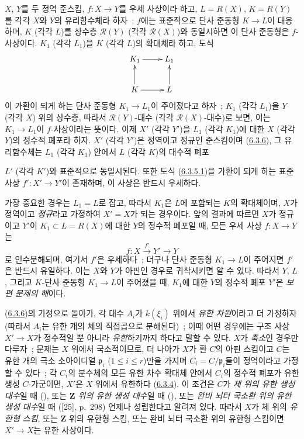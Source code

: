 \begin{env}[6.3.9]
\label{II.6.3.9-ko}
$X$, $Y$를 두 정역 준스킴, $f:X\to Y$를 우세 사상이라 하고,
$L=R(X)$, $K=R(Y)$를 각각 $X$와 $Y$의 유리함수체라 하자~; $f$에는
표준적으로 단사 준동형 $K\to L$이 대응하며, $K$ (각각 $L$)를 상수층
$\mathcal{R}(Y)$ (각각 $\mathcal{R}(X)$)와 동일시하면 이 단사 준동형은
$f$-사상이다. $K_1$ (각각 $L_1$)을 $K$ (각각 $L$)의 확대체라 하고,
도식
\[
\xymatrix{
K_1\ar[r]&L_1\\
K\ar[u]\ar[r]&L\ar[u]
}
\]
이 가환이 되게 하는 단사 준동형 $K_1\to L_1$이 주어졌다고 하자~;
$K_1$ (각각 $L_1$)을 $Y$ (각각 $X$) 위의 상수층, 따라서
$\mathcal{R}(Y)$-대수 (각각 $\mathcal{R}(X)$-대수)로 보면, 이는
$K_1\to L_1$이 $f$-사상이라는 뜻이다. 이제 $X'$ (각각 $Y'$)을
$L_1$ (각각 $K_1$)에 대한 $X$ (각각 $Y$)의 정수적 폐포라 하자.
$X'$ (각각 $Y'$)은 정역이고 정규인 준스킴이며
(\hyperref[II.6.3.6-ko]{6.3.6}), 그 유리함수체는 $L_1$ (각각 $K_1$)
안에서 $L$ (각각 $K$)의 대수적 폐포


$L'$ (각각 $K'$)와 표준적으로 동일시된다. 또한 도식
(\hyperref[II.6.3.5.1-ko]{6.3.5.1})을 가환이 되게 하는 표준 사상
$f':X'\to Y'$이 존재하며, 이 사상은 반드시 우세하다.

가장 중요한 경우는 $L_1=L$로 잡고, 따라서 $K_1$은 $L$에 포함되는
$K$의 확대체이며, $X$가 정역이고 \emph{정규}라고 가정하여 $X'=X$가
되는 경우이다. 앞의 결과에 따르면 $X$가 정규이고 $Y'$이
$K_1\subset L=R(X)$에 대한 $Y$의 정수적 폐포일 때, 모든 우세 사상
$f:X\to Y$는
\[
f:X\xrightarrow{f'}Y'\to Y
\]
로 인수분해되며, 여기서 $f'$은 우세하다~; 더구나 단사 준동형
$K_1\to L$이 주어지면 $f'$은 반드시 유일하다. 이는 $X$와 $Y$가
아핀인 경우로 귀착시키면 알 수 있다. 따라서 $Y$, $L$, 그리고
$K$-단사 준동형 $K_1\to L$이 주어졌을 때, $K_1$에 대한 $Y$의 정수적
폐포 $Y'$은 \emph{보편 문제의 해}이다.
\end{env}

\begin{remark}[6.3.10]
\label{II.6.3.10-ko}
(\hyperref[II.6.3.6-ko]{6.3.6})의 가정으로 돌아가, 각 대수 $A_i$가
$k(\xi_i)$ 위에서 \emph{유한 차원}이라고 더 가정하자(따라서 $A_i$는
유한 개의 체의 직접곱으로 분해된다)~; 이때 어떤 경우에는 구조 사상
$X'\to X$가 정수적일 뿐 아니라 \emph{유한}하기까지 하다고 말할 수
있다. $X$가 \emph{축소}인 경우만 다루자~; 문제는 $X$ 위에서
국소적이므로, 더 나아가 $X$가 환 $C$의 아핀 스킴이고 $C$는 유한 개의
극소 소아이디얼 $\mathfrak{p}_i$ ($1\leq i\leq r$)만을 가지며
$C_i=C/\mathfrak{p}_i$들이 정역이라고 가정할 수 있다~; 각 $C_i$의
분수체의 모든 유한 차수 확대체 안에서 $C_i$의 정수적 폐포가 유한
생성 $C$-가군이면, $X'$은 $X$ 위에서 유한하다
(\hyperref[II.6.3.4-ko]{6.3.4}). 이 조건은 $C$가 \emph{체 위의 유한
생성 대수}일 때 (\cite[t.~I, p.~267, th.~9]{I-13}), 또는
\emph{$\mathbf{Z}$ 위의 유한 생성 대수}일 때
(\cite[t.~I, p.~93, th.~3]{I-9}), 또는 \emph{완비 뇌터 국소환 위의
유한 생성 대수}일 때 ([25], p.~298) 언제나 성립한다고 알려져 있다.
따라서 $X$가 체 위의 \emph{유한형 스킴}, 또는 $\mathbf{Z}$ 위의
유한형 스킴, 또는 완비 뇌터 국소환 위의 유한형 스킴이면
$X'\to X$는 유한 사상이다.
\end{remark}

